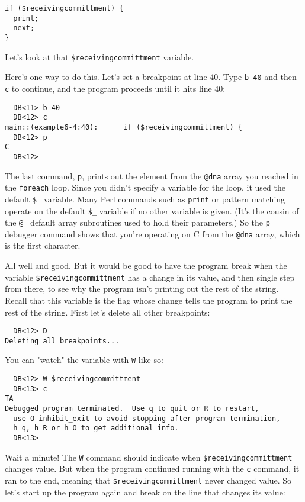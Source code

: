 \begin{lstlisting}
if ($receivingcommittment) {
  print;
  next;
}
\end{lstlisting}

Let's look at that \verb|$receivingcommittment| variable.

Here's one way to do this. Let's set a breakpoint at line 40. Type \verb|b 40| and then \verb|c| to continue, and the program proceeds until it hits line 40: 

\begin{lstlisting}
  DB<11> b 40
  DB<12> c
main::(example6-4:40):      if ($receivingcommittment) {
  DB<12> p
C
  DB<12> 
\end{lstlisting}

The last command, \verb|p|, prints out the element from the \verb|@dna| array you reached in the \verb|foreach| loop. Since you didn't specify a variable for the loop, it used the default \verb|$_| variable. Many Perl commands such as \verb|print| or pattern matching operate on the default \verb|$_| variable if no other variable is given. (It's the cousin of the \verb|@_| default array subroutines used to hold their parameters.) So the \verb|p| debugger command shows that you're operating on C from the \verb|@dna| array, which is the first character.

All well and good. But it would be good to have the program break when the variable \verb|$receivingcommittment| has a change in its value, and then single step from there, to see why the program isn't printing out the rest of the string. Recall that this variable is the flag whose change tells the program to print the rest of the string. First let's delete all other breakpoints: 

\begin{lstlisting}
  DB<12> D
Deleting all breakpoints...
\end{lstlisting}

You can "watch" the variable with \verb|W| like so: 

\begin{lstlisting}
  DB<12> W $receivingcommittment
  DB<13> c
TA
Debugged program terminated.  Use q to quit or R to restart,
  use O inhibit_exit to avoid stopping after program termination,
  h q, h R or h O to get additional info.  
  DB<13> 
\end{lstlisting}

Wait a minute! The \verb|W| command should indicate when \verb|$receivingcommittment| changes value. But when the program continued running with the \verb|c| command, it ran to the end, meaning that \verb|$receivingcommittment| never changed value. So let's start up the program again and break on the line that changes its value: 

